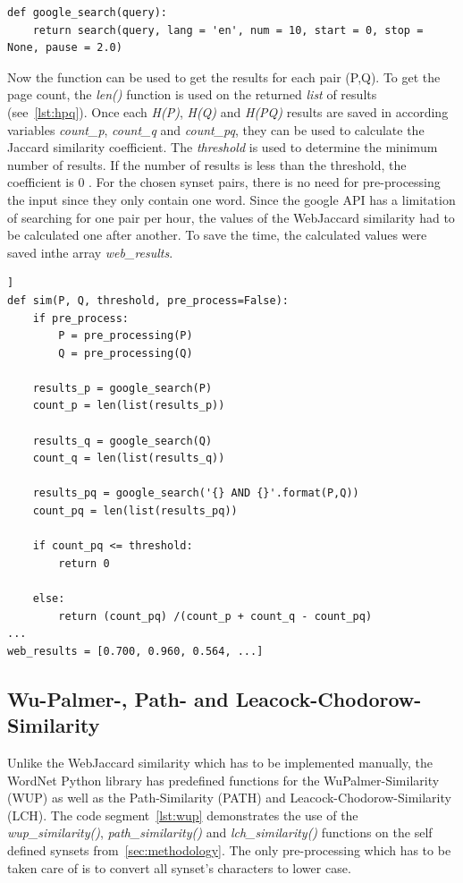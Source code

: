 \documentclass[conference]{IEEEtran}
\begin{document}
\begin{lstlisting}[frame=single, label=lst:googlesearch, caption={Google search function}, captionpos=b]
def google_search(query):
    return search(query, lang = 'en', num = 10, start = 0, stop = None, pause = 2.0)
\end{lstlisting}

Now the function can be used to get the results for each pair (P,Q). To get the page count, the \textit{len()} function is used on the returned \textit{list} of results (see~\ref{lst:hpq}). Once each \textit{H(P)}, \textit{H(Q)} and \textit{H(PQ)} results are saved in according variables \textit{count\_p}, \textit{count\_q} and \textit{count\_pq}, they can be used to calculate the Jaccard similarity coefficient. The \textit{threshold} is used to determine the minimum number of results. If the number of results is less than the threshold, the coefficient is 0 \cite{websim}. For the chosen synset pairs, there is no need for pre-processing the input since they only contain one word. Since the google API has a limitation of searching for one pair per hour, the values of the WebJaccard similarity had to be calculated one after another. To save the time, the calculated values were saved inthe array \textit{web\_results}.

\begin{lstlisting}[frame=single, label=lst:hpq, caption={Getting google results and calculation of WebJaccard similarity}, captionpos=b]]
def sim(P, Q, threshold, pre_process=False):
    if pre_process:
        P = pre_processing(P)
        Q = pre_processing(Q)

    results_p = google_search(P)
    count_p = len(list(results_p))

    results_q = google_search(Q)
    count_q = len(list(results_q))
    
    results_pq = google_search('{} AND {}'.format(P,Q))
    count_pq = len(list(results_pq))
    
    if count_pq <= threshold:
        return 0
    
    else:
        return (count_pq) /(count_p + count_q - count_pq)
...
web_results = [0.700, 0.960, 0.564, ...]
\end{lstlisting}

\subsection{Wu-Palmer-, Path- and Leacock-Chodorow-Similarity}\label{subsec:wup}
Unlike the WebJaccard similarity which has to be implemented manually, the WordNet Python library has predefined functions for the WuPalmer-Similarity (WUP) as well as the Path-Similarity (PATH) and Leacock-Chodorow-Similarity (LCH). The code segment~\ref{lst:wup} demonstrates the use of the \textit{wup\_similarity()}, \textit{path\_similarity()} and \textit{lch\_similarity()} functions on the self defined synsets from~\ref{sec:methodology}. The only pre-processing which has to be taken care of is to convert all synset's characters to lower case.
\end{document}

